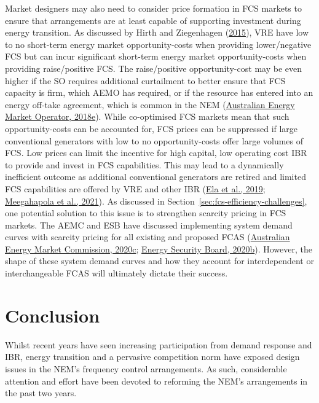 \documentclass[12pt,a4paper,]{report}
\begin{document}
Market designers may also need to consider price formation in FCS
markets to ensure that arrangements are at least capable of supporting
investment during energy transition. As discussed by Hirth and
Ziegenhagen
(\protect\hyperlink{ref-hirthBalancingPowerVariable2015}{2015}), VRE
have low to no short-term energy market opportunity-costs when providing
lower/negative FCS but can incur significant short-term energy market
opportunity-costs when providing raise/positive FCS. The raise/positive
opportunity-cost may be even higher if the SO requires additional
curtailment to better ensure that FCS capacity is firm, which AEMO has
required, or if the resource has entered into an energy off-take
agreement, which is common in the NEM
(\protect\hyperlink{ref-australianenergymarketoperatorHornsdaleWindFarm2018}{Australian
Energy Market Operator, 2018e}). While co-optimised FCS markets mean
that such opportunity-costs can be accounted for, FCS prices can be
suppressed if large conventional generators with low to no
opportunity-costs offer large volumes of FCS. Low prices can limit the
incentive for high capital, low operating cost IBR to provide and invest
in FCS capabilities. This may lead to a dynamically inefficient outcome
as additional conventional generators are retired and limited FCS
capabilities are offered by VRE and other IBR
(\protect\hyperlink{ref-elaFutureElectricityMarkets2019}{Ela et al.,
2019};
\protect\hyperlink{ref-meegahapolaPowerSystemStability2021}{Meegahapola
et al., 2021}). As discussed in
Section~\ref{sec:fcs-efficiency-challenges}, one potential solution to
this issue is to strengthen scarcity pricing in FCS markets. The AEMC
and ESB have discussed implementing system demand curves with scarcity
pricing for all existing and proposed FCAS
(\protect\hyperlink{ref-australianenergymarketcommissionFrequencyControlRule2020}{Australian
Energy Market Commission, 2020c};
\protect\hyperlink{ref-energysecurityboardPost2025Market2020}{Energy
Security Board, 2020b}). However, the shape of these system demand
curves and how they account for interdependent or interchangeable FCAS
will ultimately dictate their success.

\hypertarget{conclusion}{%
\section{Conclusion}\label{conclusion}}

Whilst recent years have seen increasing participation from demand
response and IBR, energy transition and a pervasive competition norm
have exposed design issues in the NEM's frequency control arrangements.
As such, considerable attention and effort have been devoted to
reforming the NEM's arrangements in the past two years.
\end{document}
